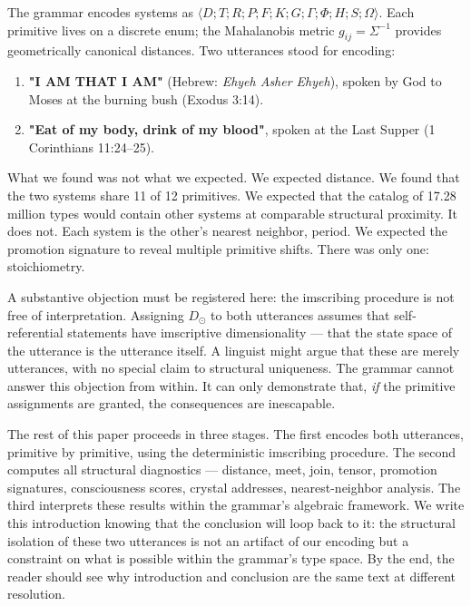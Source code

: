 \documentclass[12pt,a4paper]{article}
\begin{document}
The grammar encodes systems as $\langle D; T; R; P; F; K; G; \Gamma; \Phi; H; S; \Omega \rangle$. Each primitive lives on a discrete enum; the Mahalanobis metric $g_{ij} = \Sigma^{-1}$ provides geometrically canonical distances. Two utterances stood for encoding:

\begin{enumerate}
    \item \textbf{"I AM THAT I AM"} (Hebrew: \emph{Ehyeh Asher Ehyeh}), spoken by God to Moses at the burning bush (Exodus 3:14).
    \item \textbf{"Eat of my body, drink of my blood"}, spoken at the Last Supper (1 Corinthians 11:24--25).
\end{enumerate}

What we found was not what we expected. We expected distance. We found that the two systems share 11 of 12 primitives. We expected that the catalog of 17.28 million types would contain other systems at comparable structural proximity. It does not. Each system is the other's nearest neighbor, period. We expected the promotion signature to reveal multiple primitive shifts. There was only one: stoichiometry.

A substantive objection must be registered here: the imscribing procedure is not free of interpretation. Assigning $D_{\odot}$ to both utterances assumes that self-referential statements have imscriptive dimensionality --- that the state space of the utterance is the utterance itself. A linguist might argue that these are merely utterances, with no special claim to structural uniqueness. The grammar cannot answer this objection from within. It can only demonstrate that, \emph{if} the primitive assignments are granted, the consequences are inescapable.

The rest of this paper proceeds in three stages. The first encodes both utterances, primitive by primitive, using the deterministic imscribing procedure. The second computes all structural diagnostics --- distance, meet, join, tensor, promotion signatures, consciousness scores, crystal addresses, nearest-neighbor analysis. The third interprets these results within the grammar's algebraic framework. We write this introduction knowing that the conclusion will loop back to it: the structural isolation of these two utterances is not an artifact of our encoding but a constraint on what is possible within the grammar's type space. By the end, the reader should see why introduction and conclusion are the same text at different resolution.
\end{document}
